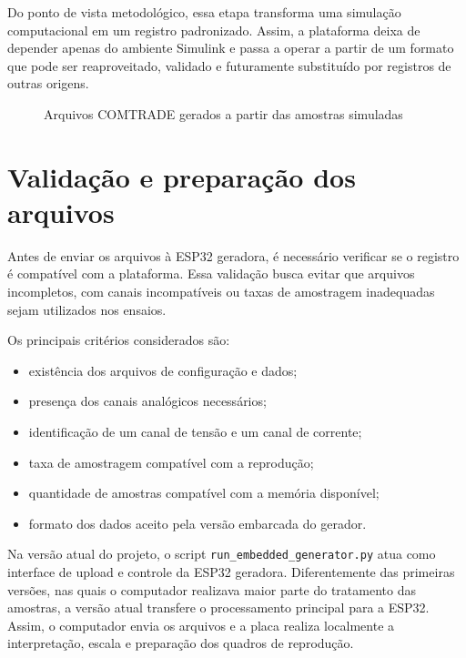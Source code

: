 Do ponto de vista metodológico, essa etapa transforma uma simulação computacional em um registro padronizado. Assim, a plataforma deixa de depender apenas do ambiente Simulink e passa a operar a partir de um formato que pode ser reaproveitado, validado e futuramente substituído por registros de outras origens.

\begin{figure}[H]
  \centering
  \caption{Arquivos COMTRADE gerados a partir das amostras simuladas}
  \label{fig:arquivos-comtrade}
\end{figure}

\section{Validação e preparação dos arquivos}

Antes de enviar os arquivos à ESP32 geradora, é necessário verificar se o registro é compatível com a plataforma. Essa validação busca evitar que arquivos incompletos, com canais incompatíveis ou taxas de amostragem inadequadas sejam utilizados nos ensaios.

Os principais critérios considerados são:

\begin{itemize}
  \item existência dos arquivos de configuração e dados;
  \item presença dos canais analógicos necessários;
  \item identificação de um canal de tensão e um canal de corrente;
  \item taxa de amostragem compatível com a reprodução;
  \item quantidade de amostras compatível com a memória disponível;
  \item formato dos dados aceito pela versão embarcada do gerador.
\end{itemize}

Na versão atual do projeto, o script \texttt{run\_embedded\_generator.py} atua como interface de upload e controle da ESP32 geradora. Diferentemente das primeiras versões, nas quais o computador realizava maior parte do tratamento das amostras, a versão atual transfere o processamento principal para a ESP32. Assim, o computador envia os arquivos e a placa realiza localmente a interpretação, escala e preparação dos quadros de reprodução.

